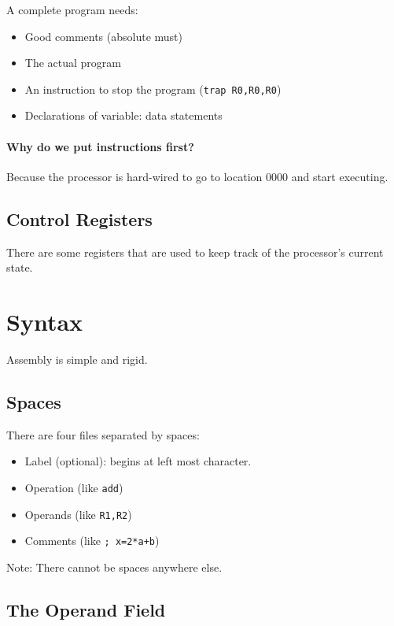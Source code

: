 A complete program needs:
\begin{itemize}
	\item Good comments (absolute must)
	\item The actual program
	\item An instruction to stop the program (\texttt{trap R0,R0,R0})
	\item Declarations of variable: data statements
\end{itemize}

\paragraph{Why do we put instructions first?}
Because the processor is hard-wired to go to location \(0000\) and start executing.

\subsection{Control Registers}\label{sub:control_registers}

There are some registers that are used to keep track of the processor's current state.

\section{Syntax}\label{sec:syntax}

Assembly is simple and rigid.

\subsection{Spaces}\label{sub:spaces}

There are four files separated by spaces:
\begin{itemize}
	\item Label (optional): begins at left most character.
	\item Operation (like \texttt{add})
	\item Operands (like \texttt{R1,R2})
	\item Comments (like \texttt{; x=2*a+b})
\end{itemize}

\begin{note}
	Note: There cannot be spaces anywhere else.
\end{note}

\subsection{The Operand Field}\label{sub:the_operand_field}

